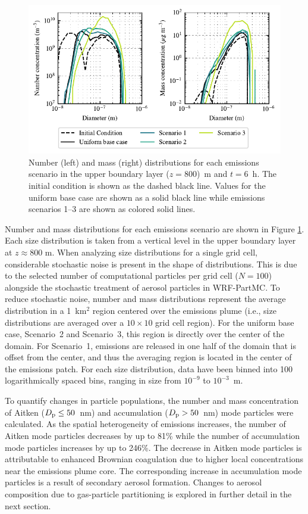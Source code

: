 \documentclass[journal abbreviation, manuscript]{copernicus}
\begin{document}
\begin{figure}[!h]
	\centering
	\includegraphics[]{figures/combined_num_mass_conc_i50_j50_k60.pdf}
	\caption{Number (left) and mass (right) distributions for each emissions scenario in the upper boundary layer ($z=800$)~m and $t=6$~h. The initial condition is shown as the dashed black line. Values for the uniform base case are shown as a solid black line while emissions scenarios 1--3 are shown as colored solid lines.}
	\label{fig:size-dists}
\end{figure} 

Number and mass distributions for each emissions scenario are shown in
Figure \ref{fig:size-dists}. Each size distribution is taken from a
vertical level in the upper boundary layer at $z\approx800$ m. When
analyzing size distributions for a single grid cell, considerable
stochastic noise is present in the shape of distributions. This is due
to the selected number of computational particles per grid cell ($N =
100$) alongside the stochastic treatment of aerosol particles in
WRF-PartMC. To reduce stochastic noise, number and mass distributions
represent the average distribution in a 1~km$^2$ region centered over
the emissions plume (i.e., size distributions are averaged over a
$10\times10$ grid cell region). For the uniform base case, Scenario~2
and Scenario~3, this region is directly over the center of the
domain. For Scenario~1, emissions are released in one half of the
domain that is offset from the center, and thus the averaging region
is located in the center of the emissions patch. For each size
distribution, data have been binned into 100 logarithmically spaced
bins, ranging in size from $10^{-9}$ to $10^{-3}$~m.

To quantify changes in particle populations, the number and mass
concentration of Aitken ($D_{\rm p} \leq 50$~nm) and accumulation
($D_{\rm p} > 50$~nm) mode particles were calculated. As the spatial
heterogeneity of emissions increases, the number of Aitken mode
particles decreases by up to 81\% while the number of accumulation
mode particles increases by up to 246\%. The decrease in Aitken mode
particles is attributable to enhanced Brownian coagulation due to
higher local concentrations near the emissions plume core. The
corresponding increase in accumulation mode particles is a result of
secondary aerosol formation.  Changes to aerosol composition due to
gas-particle partitioning is explored in further detail in the next
section.
\end{document}
